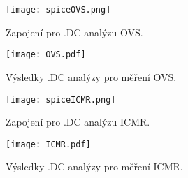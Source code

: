 \begin{figure}[h!]
    \centering
    \texttt{[image: spiceOVS.png]}
    \caption{Zapojení pro .DC analýzu OVS.}
    \label{fig:spice1.png}
\end{figure}

\begin{figure}[h!]
    \centering
    \texttt{[image: OVS.pdf]}
    \caption{Výsledky .DC analýzy pro měření OVS.}
    \label{fig:OVS.pdf}
\end{figure}

\begin{figure}[h!]
    \centering
    \texttt{[image: spiceICMR.png]}
    \caption{Zapojení pro .DC analýzu ICMR.}
    \label{fig:spice1.png}
\end{figure}

\begin{figure}[h!]
    \centering
    \texttt{[image: ICMR.pdf]}
    \caption{Výsledky .DC analýzy pro měření ICMR.}
    \label{fig:OVS.pdf}
\end{figure}


